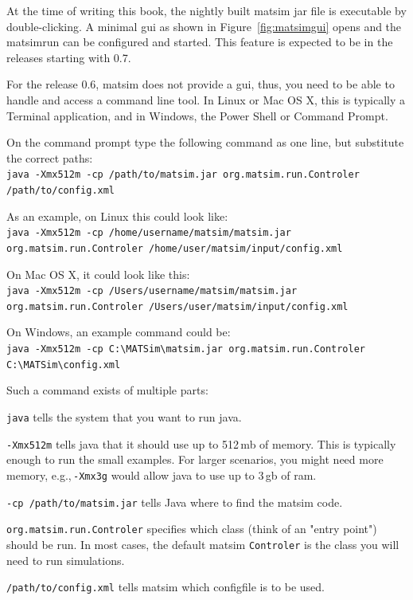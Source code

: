 At the time of writing this book, the nightly built \gls{matsim} \gls{jar} file is executable by double-clicking. A minimal \gls{gui} as shown in Figure~\ref{fig:matsimgui} opens and the \gls{matsimrun} can be configured and started. 
This feature is expected to be in the releases starting with 0.7.

For the release 0.6, \gls{matsim} does not provide a \gls{gui}, thus, you need to be able to handle and access a command line tool. In Linux or Mac OS X, this is typically a Terminal application, and in Windows, the Power Shell or Command Prompt.

On the command prompt type the following command as one line, but substitute the correct paths: \\
\lstinline|java -Xmx512m -cp /path/to/matsim.jar org.matsim.run.Controler /path/to/config.xml|

As an example, on Linux this could look like: \\
\lstinline|java -Xmx512m -cp /home/username/matsim/matsim.jar org.matsim.run.Controler /home/user/matsim/input/config.xml|

On Mac OS X, it could look like this: \\
\lstinline|java -Xmx512m -cp /Users/username/matsim/matsim.jar org.matsim.run.Controler /Users/user/matsim/input/config.xml|

On Windows, an example command could be: \\
\lstinline|java -Xmx512m -cp C:\MATSim\matsim.jar org.matsim.run.Controler C:\MATSim\config.xml|

Such a command exists of multiple parts:
\begin{compactitem}
\item \lstinline|java| tells the system that you want to run \gls{java}.
\item \lstinline|-Xmx512m| tells \gls{java} that it should use up to 512\,\gls{mb} of memory. This is typically enough to run the small examples. For larger \glspl{scenario}, you might need more memory, e.g.,\,\lstinline|-Xmx3g| would allow \gls{java} to use up to 3\,\gls{gb} of \gls{ram}.
\item \lstinline|-cp /path/to/matsim.jar| tells Java where to find the \gls{matsim} code.
\item \lstinline|org.matsim.run.Controler| specifies which class (think of an "entry point") should be run. In most cases, the default \gls{matsim} \lstinline|Controler| is the class you will need to run simulations.
\item \lstinline|/path/to/config.xml| tells \gls{matsim} which \gls{configfile} is to be used. 
\end{compactitem}

